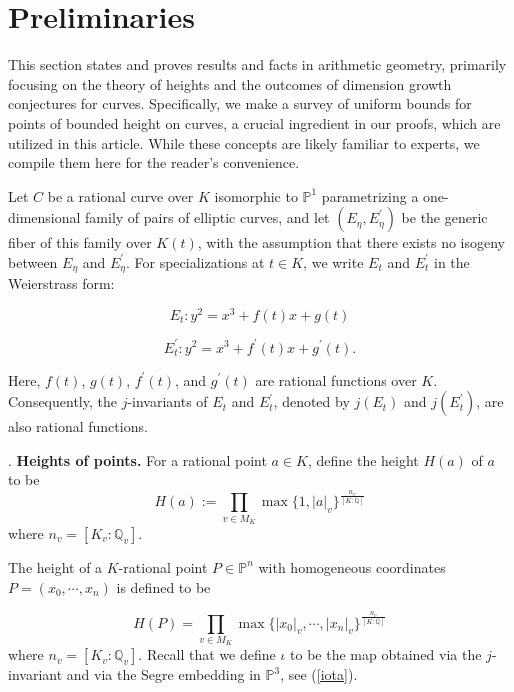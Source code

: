 \documentclass[12pt]{amsart}
\theoremstyle{definition}
\theoremstyle{remark}
\numberwithin{equation}{section}
\newcommand{\Q}{\mathbb{Q}}
\renewcommand{\P}{\mathbb{P}}
\begin{document}
\section{Preliminaries}

This section states and proves results and facts in arithmetic geometry, primarily focusing on the theory of heights and the outcomes of dimension growth conjectures for curves. Specifically, we make a survey of uniform bounds for points of bounded height on curves, a crucial ingredient in our proofs, which are utilized in this article. While these concepts are likely familiar to experts, we compile them here for the reader's convenience.

Let $C$ be a rational curve over $K$ isomorphic to $\mathbb{P}^{1}$ parametrizing a one-dimensional family of pairs of elliptic curves, and let $(E_{\eta}, E^{\prime}_{\eta})$ be the generic fiber of this family over $K(t)$, with the assumption that there exists no isogeny between $E_{\eta}$ and $E^{\prime}_{\eta}$. For specializations at $t \in K$, we write $E_{t}$ and $E^{\prime}_{t}$ in the Weierstrass form:


\begin{equation}\label{eq1}
E_{t}: y^{2} = x^{3} + f(t)x + g(t)
\end{equation}

\begin{equation}\label{eq2}
E^{\prime}_{t}: y^{2} = x^{3} + f^{\prime}(t)x + g^{\prime}(t).
\end{equation}

Here, $f(t)$, $g(t)$, $f^{\prime}(t)$, and $g^{\prime}(t)$ are rational functions over $K$. Consequently, the $j$-invariants of $E_{t}$ and $E^{\prime}_{t}$, denoted by $j(E_t)$ and $j(E^{\prime}_t)$, are also rational functions.

\vspace{1em}
. \label{heights} \textbf{Heights of points.} For a rational point $a \in K$, define the height $H(a)$ of $a$ to be 
$$H(a):= \prod_{v \in M_{K}} \max\{1, |a|_{v}\}^{\frac{n_{v}}{[K:\Q]}}$$ 
where $n_{v}=[K_{v}:\Q_{v}].$

The height of a $K$-rational point $P \in \P^{n}$ with homogeneous coordinates $P=(x_{0},\cdots, x_{n})$ is defined to be 

$$H(P)=\prod_{v \in M_{K}}\max \{\vert   x_{0}\vert   _{v}, \cdots, \vert   x_{n}\vert   _{v}\}^{\frac{n_{v}}{[K:\Q]}}$$
where $n_{v}=[K_{v}:\Q_{v}].$
 Recall that we define $\iota$ to be the map obtained via the $j$-invariant and via the Segre embedding in $\mathbb{P}^{3}$, see (\ref{iota}).
 
\end{document}
